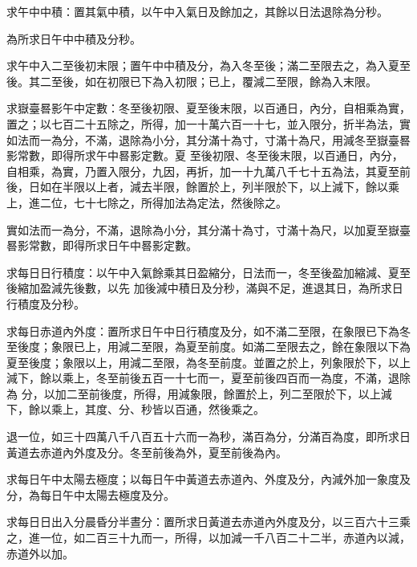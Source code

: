 \begin{pinyinscope}
 求午中中積：置其氣中積，以午中入氣日及餘加之，其餘以日法退除為分秒。



 為所求日午中中積及分秒。



 求午中入二至後初末限；置午中中積及分，為入冬至後；滿二至限去之，為入夏至後。其二至後，如在初限已下為入初限；已上，覆減二至限，餘為入末限。



 求嶽臺晷影午中定數：冬至後初限、夏至後末限，以百通日，內分，自相乘為實，置之；以七百二十五除之，所得，加一十萬六百一十七，並入限分，折半為法，實如法而一為分，不滿，退除為小分，其分滿十為寸，寸滿十為尺，用減冬至嶽臺晷影常數，即得所求午中晷影定數。夏
 至後初限、冬至後末限，以百通日，內分，自相乘，為實，乃置入限分，九因，再折，加一十九萬八千七十五為法，其夏至前後，日如在半限以上者，減去半限，餘置於上，列半限於下，以上減下，餘以乘上，進二位，七十七除之，所得加法為定法，然後除之。



 實如法而一為分，不滿，退除為小分，其分滿十為寸，寸滿十為尺，以加夏至嶽臺晷影常數，即得所求日午中晷影定數。



 求每日日行積度：以午中入氣餘乘其日盈縮分，日法而一，冬至後盈加縮減、夏至後縮加盈減先後數，以先
 加後減中積日及分秒，滿與不足，進退其日，為所求日行積度及分秒。



 求每日赤道內外度：置所求日午中日行積度及分，如不滿二至限，在象限已下為冬至後度；象限已上，用減二至限，為夏至前度。如滿二至限去之，餘在象限以下為夏至後度；象限以上，用減二至限，為冬至前度。並置之於上，列象限於下，以上減下，餘以乘上，冬至前後五百一十七而一，夏至前後四百而一為度，不滿，退除為
 分，以加二至前後度，所得，用減象限，餘置於上，列二至限於下，以上減下，餘以乘上，其度、分、秒皆以百通，然後乘之。



 退一位，如三十四萬八千八百五十六而一為秒，滿百為分，分滿百為度，即所求日黃道去赤道內外度及分。冬至前後為外，夏至前後為內。



 求每日午中太陽去極度；以每日午中黃道去赤道內、外度及分，內減外加一象度及分，為每日午中太陽去極度及分。



 求每日日出入分晨昏分半晝分：置所求日黃道去赤道內外度及分，以三百六十三乘之，進一位，如二百三十九而一，所得，以加減一千八百二十二半，赤道內以減，赤道外以加。




\end{pinyinscope}
